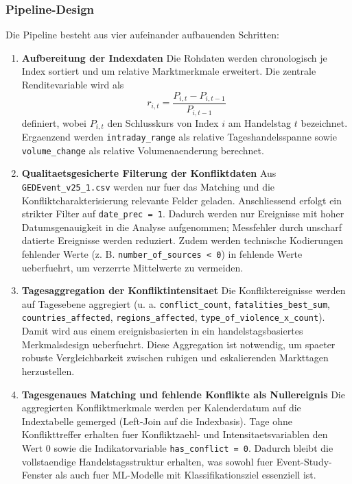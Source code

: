 \documentclass[12pt,a4paper]{article}
\begin{document}
\subsubsection{Pipeline-Design}
Die Pipeline besteht aus vier aufeinander aufbauenden Schritten:
\begin{enumerate}
  \item \textbf{Aufbereitung der Indexdaten} \newline
  Die Rohdaten werden chronologisch je
  Index sortiert und um relative Marktmerkmale erweitert. Die zentrale Renditevariable
  wird als
  \[
  r_{i,t} = \frac{P_{i,t} - P_{i,t-1}}{P_{i,t-1}}
  \]
  definiert, wobei $P_{i,t}$ den Schlusskurs von Index $i$ am Handelstag $t$ bezeichnet.
  Ergaenzend werden \texttt{intraday\_range} als relative Tageshandelsspanne sowie
  \texttt{volume\_change} als relative Volumenaenderung berechnet.

  \item \textbf{Qualitaetsgesicherte Filterung der Konfliktdaten} \newline
  Aus \texttt{GEDEvent\_v25\_1.csv} werden nur fuer das Matching und die
  Konfliktcharakterisierung relevante Felder geladen. Anschliessend erfolgt ein strikter
  Filter auf \texttt{date\_prec = 1}. Dadurch werden nur Ereignisse mit hoher
  Datumsgenauigkeit in die Analyse aufgenommen; Messfehler durch unscharf datierte
  Ereignisse werden reduziert. Zudem werden technische Kodierungen fehlender Werte
  (z. B. \texttt{number\_of\_sources < 0}) in fehlende Werte ueberfuehrt,
  um verzerrte Mittelwerte zu vermeiden.

  \item \textbf{Tagesaggregation der Konfliktintensitaet} \newline
  Die Konfliktereignisse werden auf Tagesebene aggregiert
  (u. a. \texttt{conflict\_count}, \texttt{fatalities\_best\_sum},
  \texttt{countries\_affected}, \texttt{regions\_affected},
  \texttt{type\_of\_violence\_x\_count}). Damit wird aus einem ereignisbasierten in ein
  handelstagsbasiertes Merkmalsdesign ueberfuehrt. Diese Aggregation ist notwendig, um
  spaeter robuste Vergleichbarkeit zwischen ruhigen und eskalierenden Markttagen
  herzustellen.

  \item \textbf{Tagesgenaues Matching und fehlende Konflikte als Nullereignis} \newline
  Die aggregierten Konfliktmerkmale werden per Kalenderdatum auf die Indextabelle
  gemerged (Left-Join auf die Indexbasis). Tage ohne Konflikttreffer erhalten fuer
  Konfliktzaehl- und Intensitaetsvariablen den Wert 0 sowie die Indikatorvariable
  \texttt{has\_conflict = 0}. Dadurch bleibt die vollstaendige Handelstagsstruktur
  erhalten, was sowohl fuer Event-Study-Fenster als auch fuer ML-Modelle mit
  Klassifikationsziel essenziell ist.
\end{enumerate}
\end{document}
